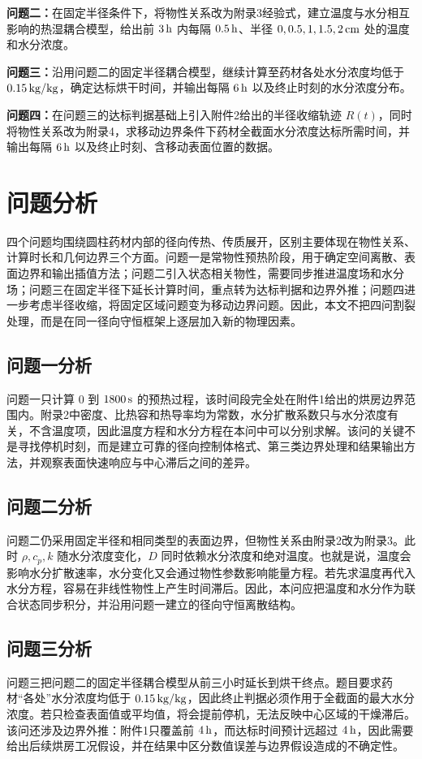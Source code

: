 \documentclass[UTF8,a4paper,12pt]{ctexart}
\begin{document}
\textbf{问题二：}在固定半径条件下，将物性关系改为附录3经验式，建立温度与水分相互影响的热湿耦合模型，给出前 $3\rm\,h$ 内每隔 $0.5\rm\,h$、半径 $0,0.5,1,1.5,2\rm\,cm$ 处的温度和水分浓度。

\textbf{问题三：}沿用问题二的固定半径耦合模型，继续计算至药材各处水分浓度均低于 $0.15\rm\,kg/kg$，确定达标烘干时间，并输出每隔 $6\rm\,h$ 以及终止时刻的水分浓度分布。

\textbf{问题四：}在问题三的达标判据基础上引入附件2给出的半径收缩轨迹 $R(t)$，同时将物性关系改为附录4，求移动边界条件下药材全截面水分浓度达标所需时间，并输出每隔 $6\rm\,h$ 以及终止时刻、含移动表面位置的数据。

\section{问题分析}
四个问题均围绕圆柱药材内部的径向传热、传质展开，区别主要体现在物性关系、计算时长和几何边界三个方面。问题一是常物性预热阶段，用于确定空间离散、表面边界和输出插值方法；问题二引入状态相关物性，需要同步推进温度场和水分场；问题三在固定半径下延长计算时间，重点转为达标判据和边界外推；问题四进一步考虑半径收缩，将固定区域问题变为移动边界问题。因此，本文不把四问割裂处理，而是在同一径向守恒框架上逐层加入新的物理因素。

\subsection{问题一分析}
问题一只计算 $0$ 到 $1800\rm\,s$ 的预热过程，该时间段完全处在附件1给出的烘房边界范围内。附录2中密度、比热容和热导率均为常数，水分扩散系数只与水分浓度有关，不含温度项，因此温度方程和水分方程在本问中可以分别求解。该问的关键不是寻找停机时刻，而是建立可靠的径向控制体格式、第三类边界处理和结果输出方法，并观察表面快速响应与中心滞后之间的差异。

\subsection{问题二分析}
问题二仍采用固定半径和相同类型的表面边界，但物性关系由附录2改为附录3。此时 $\rho,c_p,k$ 随水分浓度变化，$D$ 同时依赖水分浓度和绝对温度。也就是说，温度会影响水分扩散速率，水分变化又会通过物性参数影响能量方程。若先求温度再代入水分方程，容易在非线性物性上产生时间滞后。因此，本问应把温度和水分作为联合状态同步积分，并沿用问题一建立的径向守恒离散结构。

\subsection{问题三分析}
问题三把问题二的固定半径耦合模型从前三小时延长到烘干终点。题目要求药材“各处”水分浓度均低于 $0.15\rm\,kg/kg$，因此终止判据必须作用于全截面的最大水分浓度。若只检查表面值或平均值，将会提前停机，无法反映中心区域的干燥滞后。该问还涉及边界外推：附件1只覆盖前 $4\rm\,h$，而达标时间预计远超过 $4\rm\,h$，因此需要给出后续烘房工况假设，并在结果中区分数值误差与边界假设造成的不确定性。
\end{document}
